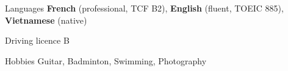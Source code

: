 

\begin{cvskills}

  \cvskill
    {Languages} %
    {\textbf{French} (professional, TCF B2), \textbf{English} (fluent, TOEIC 885), \textbf{Vietnamese} (native)} %

  \cvskill
    {Driving licence} %
    {B} %

  \cvskill
    {Hobbies} %
    {Guitar, Badminton, Swimming, Photography} %

\end{cvskills}
